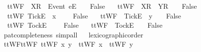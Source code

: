 \begin{isabellebody}
\ \ {\isachardoublequoteopen}ttWF{}\ {\isasymrho}\ {\isacharparenleft}{\isacharbrackleft}X{\isacharbrackright}\isactrlsub R\ {\isacharhash}\ {\isacharbrackleft}Event\ e{\isacharbrackright}\isactrlsub E\ {\isacharhash}\ {\isasymsigma}{\isacharparenright}\ {\isacharequal}\ False{\isachardoublequoteclose}\ {\isacharbar}\isanewline
\ \ {\isachardoublequoteopen}ttWF{}\ {\isasymrho}\ {\isacharparenleft}{\isacharbrackleft}X{\isacharbrackright}\isactrlsub R\ {\isacharhash}\ {\isacharbrackleft}Y{\isacharbrackright}\isactrlsub R\ {\isacharhash}\ {\isasymsigma}{\isacharparenright}\ {\isacharequal}\ False{\isachardoublequoteclose}\ {\isacharbar}\isanewline
\ \ {\isachardoublequoteopen}ttWF{}\ {\isacharparenleft}{\isacharbrackleft}Tick{\isacharbrackright}\isactrlsub E\ {\isacharhash}\ x\ {\isacharhash}\ {\isasymrho}{\isacharparenright}\ {\isasymsigma}\ {\isacharequal}\ False{\isachardoublequoteclose}\ {\isacharbar}\isanewline
\ \ {\isachardoublequoteopen}ttWF{}\ {\isasymrho}\ {\isacharparenleft}{\isacharbrackleft}Tick{\isacharbrackright}\isactrlsub E\ {\isacharhash}\ y\ {\isacharhash}\ {\isasymsigma}{\isacharparenright}\ {\isacharequal}\ False{\isachardoublequoteclose}\ {\isacharbar}\isanewline
\ \ {\isachardoublequoteopen}ttWF{}\ {\isacharparenleft}{\isacharbrackleft}Tock{\isacharbrackright}\isactrlsub E\ {\isacharhash}\ {\isasymrho}{\isacharparenright}\ {\isasymsigma}\ {\isacharequal}\ False{\isachardoublequoteclose}\ {\isacharbar}\isanewline
\ \ {\isachardoublequoteopen}ttWF{}\ {\isasymrho}\ {\isacharparenleft}{\isacharbrackleft}Tock{\isacharbrackright}\isactrlsub E\ {\isacharhash}\ {\isasymsigma}{\isacharparenright}\ {\isacharequal}\ False{\isachardoublequoteclose}\isanewline
%
\isadelimproof
\ \ %
\endisadelimproof
%
\isatagproof
{}\isamarkupfalse%
\ {\isacharparenleft}pat{\isacharunderscore}completeness{\isacharcomma}\ simp{\isacharunderscore}all{\isacharparenright}%
\endisatagproof
{\isafoldproof}%
%
\isadelimproof
\isanewline
%
\endisadelimproof
{}\isamarkupfalse%
%
\isadelimproof
\ %
\endisadelimproof
%
\isatagproof
{}\isamarkupfalse%
\ lexicographic{\isacharunderscore}order%
\endisatagproof
{\isafoldproof}%
%
\isadelimproof
%
\endisadelimproof
\isanewline
\isanewline
{}\isamarkupfalse%
\isanewline
\isanewline
{}\isamarkupfalse%
\ ttWF{}{\isacharunderscore}ttWF{\isacharcolon}\ {\isachardoublequoteopen}ttWF{}\ x\ y\ {\isacharequal}\ {\isacharparenleft}ttWF\ x\ {\isasymand}\ ttWF\ y{\isacharparenright}{\isachardoublequoteclose}\isanewline

\end{isabellebody}
